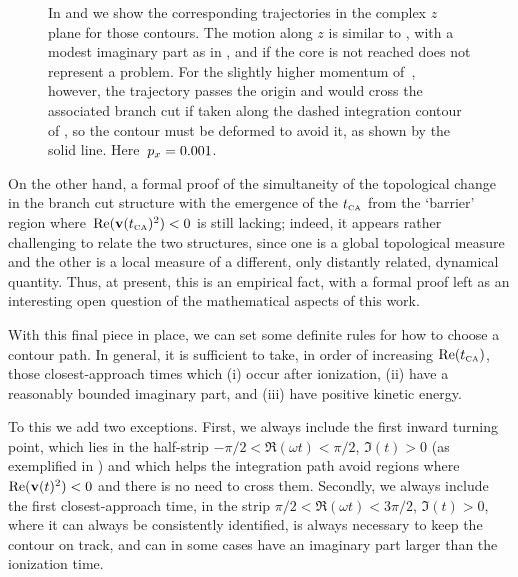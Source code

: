 \begin{figure}[p]
{    In \protect{} and \protect{} we show the corresponding trajectories in the complex $z$ plane for those contours. The motion along $z$ is similar to , with a modest imaginary part as in , and if the core is not reached does not represent a problem. For the slightly higher momentum of~\protect{}, however, the trajectory passes the origin and would cross the associated branch cut if taken along the dashed integration contour of \protect{}, so the contour must be deformed to avoid it, as shown by the solid line.
    Here~$p_x=0.001$.
}
\label{f5-branch-cut-topology-change}
\end{figure}




\restoregeometry
\clearpage
\onehalfspacing

\pagestyle{standard}









On the other hand, a formal proof of the simultaneity of the topological change in the branch cut structure with the emergence of the ${t_{\scriptscriptstyle\mathrm{CA}}}$ from the `barrier' region where~$\Re(\vb{v}({t_{\scriptscriptstyle\mathrm{CA}}})^2)<0$ is still lacking; indeed, it appears rather challenging to relate the two structures, since one is a global topological measure and the other is a local measure of a different, only distantly related, dynamical quantity. Thus, at present, this is an empirical fact, with a formal proof left as an interesting open question of the mathematical aspects of this work.



With this final piece in place, we can set some definite rules for how to choose a contour path. In general, it is sufficient to take, in order of increasing $\Re({t_{\scriptscriptstyle\mathrm{CA}}})$, those closest-approach times which (i) occur after ionization, (ii) have a reasonably bounded imaginary part, and (iii) have positive kinetic energy. 

To this we add two exceptions. First, we always include the first inward turning point, which lies in the half-strip $-\pi/2<\Re(\omega t)<\pi/2$, $\Im(t)>0$ (as exemplified in ) and which helps the integration path avoid regions where $\Re(\vb{v}(t)^2)<0$ and there is no need to cross them. Secondly, we always include the first closest-approach time, in the strip $\pi/2<\Re(\omega t)<3\pi/2$, $\Im(t)>0$, where it can always be consistently identified, is always necessary to keep the contour on track, and can in some cases have an imaginary part larger than the ionization time.

